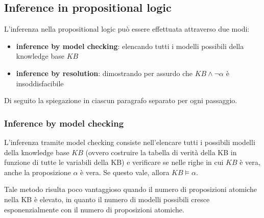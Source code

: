 \newpage

\subsection{Inference in propositional logic}
L'inferenza nella propositional logic può essere effettuata attraverso due modi:
\begin{itemize}
	\item \textbf{inference by model checking}: elencando tutti i modelli possibili della knowledge base \(KB\)
	\item \textbf{inference by resolution}: dimostrando per assurdo che \(KB \land \neg \alpha\) è insoddisfacibile
\end{itemize}
Di seguito la spiegazione in ciascun paragrafo separato per ogni passaggio.

\subsubsection*{Inference by model checking}
L'inferenza tramite model checking consiste nell'elencare tutti i possibili modelli della knowledge base \(KB\) (ovvero costruire
la tabella di verità della KB in funzione di tutte le variabili della KB) e verificare se nelle righe in cui \(KB\) è vera, anche
la proposizione \(\alpha\) è vera. Se questo vale, allora \(KB \models \alpha\).

Tale metodo risulta poco vantaggioso quando il numero di proposizioni atomiche nella KB è elevato, in quanto il numero di
modelli possibili cresce esponenzialmente con il numero di proposizioni atomiche.

